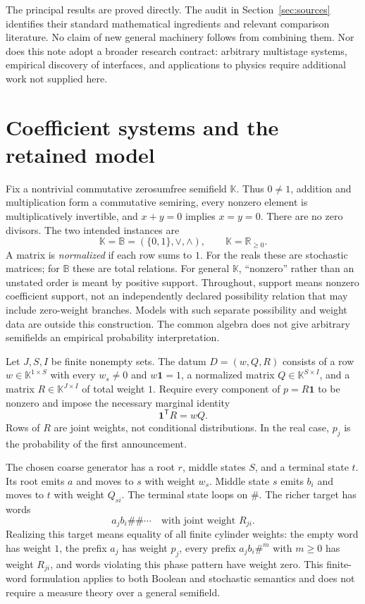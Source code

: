 \documentclass[11pt]{article}
\newcommand{\K}{\mathbb K}
\newcommand{\B}{\mathbb B}
\newcommand{\R}{\mathbb R}
\newcommand{\one}{\mathbf 1}
\theoremstyle{remark}
\begin{document}
The principal results are proved directly. The audit in Section~\ref{sec:sources} identifies their standard mathematical ingredients and relevant comparison literature. No claim of new general machinery follows from combining them. Nor does this note adopt a broader research contract: arbitrary multistage systems, empirical discovery of interfaces, and applications to physics require additional work not supplied here.

\section{Coefficient systems and the retained model}

Fix a nontrivial commutative zerosumfree semifield $\K$. Thus $0\ne1$, addition and multiplication form a commutative semiring, every nonzero element is multiplicatively invertible, and $x+y=0$ implies $x=y=0$. There are no zero divisors. The two intended instances are
\[
 \K=\B=(\{0,1\},\vee,\wedge),\qquad
 \K=\R_{\ge0}.
\]
A matrix is \emph{normalized} if each row sums to $1$. For the reals these are stochastic matrices; for $\B$ these are total relations. For general $\K$, ``nonzero'' rather than an unstated order is meant by positive support. Throughout, support means nonzero coefficient support, not an independently declared possibility relation that may include zero-weight branches. Models with such separate possibility and weight data are outside this construction. The common algebra does not give arbitrary semifields an empirical probability interpretation.

Let $J,S,I$ be finite nonempty sets. The datum $D=(w,Q,R)$ consists of a row $w\in\K^{1\times S}$ with every $w_s\ne0$ and $w\one=1$, a normalized matrix $Q\in\K^{S\times I}$, and a matrix $R\in\K^{J\times I}$ of total weight $1$. Require every component of $p=R\one$ to be nonzero and impose the necessary marginal identity
\begin{equation}\label{eq:marginal}
 \one^{\mathsf T}R=wQ.
\end{equation}
Rows of $R$ are joint weights, not conditional distributions. In the real case, $p_j$ is the probability of the first announcement.

The chosen coarse generator has a root $r$, middle states $S$, and a terminal state $t$. Its root emits $a$ and moves to $s$ with weight $w_s$. Middle state $s$ emits $b_i$ and moves to $t$ with weight $Q_{si}$. The terminal state loops on $\#$. The richer target has words
\[
 a_jb_i\#\#\cdots\quad\text{with joint weight }R_{ji}.
\]
Realizing this target means equality of all finite cylinder weights: the empty word has weight $1$, the prefix $a_j$ has weight $p_j$, every prefix $a_jb_i\#^m$ with $m\ge0$ has weight $R_{ji}$, and words violating this phase pattern have weight zero. This finite-word formulation applies to both Boolean and stochastic semantics and does not require a measure theory over a general semifield.
\end{document}
